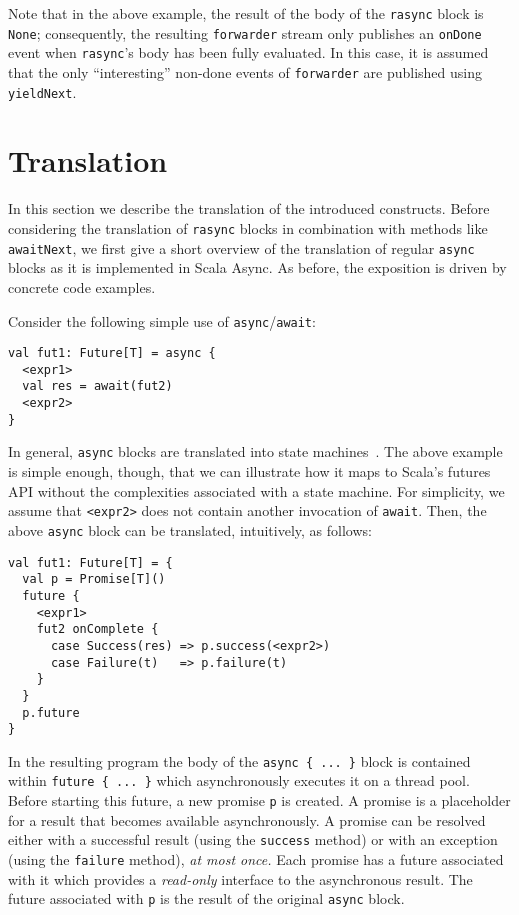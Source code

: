 \documentclass{acm_proc_article-sp}
\begin{document}
Note that in the above example, the result of the body of the \verb|rasync|
block is \verb|None|; consequently, the resulting \verb|forwarder| stream only
publishes an \verb|onDone| event when \verb|rasync|'s body has been fully
evaluated. In this case, it is assumed that the only ``interesting'' non-done
events of \verb|forwarder| are published using \verb|yieldNext|.

\section{Translation}\label{sec:translation}

In this section we describe the translation of the introduced constructs.
Before considering the translation of \verb|rasync| blocks in combination with
methods like \verb|awaitNext|, we first give a short overview of the
translation of regular \verb|async| blocks as it is implemented in Scala
Async. As before, the exposition is driven by concrete code examples.

Consider the following simple use of \verb|async|/\verb|await|:

\begin{lstlisting}
val fut1: Future[T] = async {
  <expr1>
  val res = await(fut2)
  <expr2>
}
\end{lstlisting}

In general, \verb|async| blocks are translated into state
machines~\cite{ScalaAsyncSIP}. The above example is simple enough, though,
that we can illustrate how it maps to Scala's futures API without the
complexities associated with a state machine. For simplicity, we assume that
\verb|<expr2>| does not contain another invocation of \verb|await|. Then, the
above \verb|async| block can be translated, intuitively, as follows:

\begin{lstlisting}
val fut1: Future[T] = {
  val p = Promise[T]()
  future {
    <expr1>
    fut2 onComplete {
      case Success(res) => p.success(<expr2>)
      case Failure(t)   => p.failure(t)
    }
  }
  p.future
}
\end{lstlisting}

In the resulting program the body of the \verb|async { ... }| block is
contained within \verb|future { ... }| which asynchronously executes it on a
thread pool. Before starting this future, a new promise \verb|p| is created. A
promise is a placeholder for a result that becomes available asynchronously. A
promise can be resolved either with a successful result (using the
\verb|success| method) or with an exception (using the \verb|failure| method),
{\em at most once.} Each promise has a future associated with it which
provides a {\em read-only} interface to the asynchronous result. The future
associated with \verb|p| is the result of the original \verb|async| block.
\end{document}
